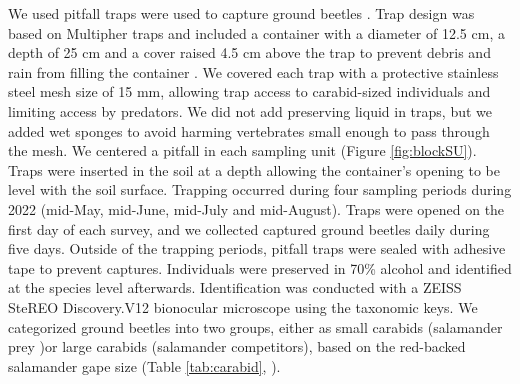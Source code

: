We used pitfall traps were used to capture ground beetles \citep{baarsCatchesPitfallTraps1979,spenceSamplingCarabidAssemblages1994a,loveiEcologyBehaviorGround1996,kotzeFortyYearsCarabid2011a,knappEffectPitfallTrap2012}. 
Trap design was based on Multipher\up{\textregistered{}} traps and included a container with a diameter of 12.5 cm, a depth of 25 cm and a cover raised 4.5 cm above the trap 
to prevent debris and rain from filling the container \citep{Jobin1988MultiPherinsect,mooreEffectsTwoSilvicultural2004,bouchardBeetleCommunityResponse2016b}. 
We covered each trap with a protective stainless steel mesh size of 15 mm, allowing trap access to carabid-sized individuals and limiting access by predators.  
We did not add preserving liquid in traps, but we added wet sponges to avoid harming vertebrates small enough to pass through the mesh. 
We centered a pitfall in each sampling unit (Figure \ref{fig:blockSU}). 
Traps were inserted in the soil at a depth allowing the container’s opening to be level with the soil surface. 
Trapping occurred during four sampling periods during 2022 (mid-May, mid-June, mid-July and mid-August). 
Traps were opened on the first day of each survey, and we collected captured ground beetles daily during five days. 
Outside of the trapping periods, pitfall traps were sealed with adhesive tape to prevent captures. 
Individuals were preserved in 70\% alcohol and identified at the species level afterwards. 
Identification was conducted with a ZEISS SteREO Discovery.V12 bionocular microscope using the \cite{larochelleManuelIdentificationCarabidae1976} taxonomic keys. 
We categorized ground beetles into two groups, either as small carabids (salamander prey )or large carabids (salamander competitors), based on the red-backed salamander gape size (Table \ref{tab:carabid}, \citealp{jaegerFoodLimitedResource1972,magliaModulationPreycaptureBehavior1995,magliaOntogenyFeedingEcology1996}).

